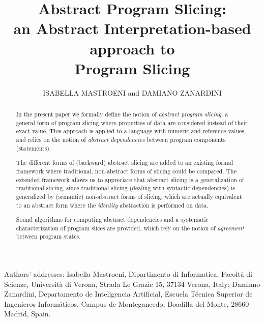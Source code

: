\documentclass[prodmode,acmtocl]{acmsmall}
\let\orgsetcounter\setcounter
\newcommand{\0}{\mbox{\bf 0}}
\begin{document}
\pagestyle{headings}  


\title{Abstract Program Slicing:\\ an Abstract Interpretation-based approach to\\ Program Slicing}

\author{
  ISABELLA MASTROENI 
  and DAMIANO ZANARDINI 
  }

\begin{abstract}
  In the present paper we formally define the notion of \emph{abstract
    program slicing}, a general form of program slicing where
  properties of data are considered instead of their exact value.
  This approach is applied to a language with numeric and reference
  values, and relies on the notion of \emph{abstract dependencies}
  between program components (statements).
  
  The different forms of (backward) abstract slicing are added to an
  existing formal framework where traditional, non-abstract forms of
  slicing could be compared.  The extended framework allows us to
  appreciate that abstract slicing is a generalization of traditional
  slicing, since traditional slicing (dealing with syntactic
  dependencies) is generalized by (semantic) non-abstract forms of
  slicing, which are actually equivalent to an abstract form where the
  \emph{identity} abstraction is performed on data.
  
  Sound algorithms for computing abstract dependencies and a
  systematic characterization of program slices are provided, which
  rely on the notion of \emph{agreement} between program states.
\end{abstract}


{\let\setcounter\orgsetcounter
\begin{bottomstuff}
  Authors' addresses: Isabella Mastroeni, Dipartimento di Informatica,
  Facolt\`a di Scienze, Universit\`a di Verona, Strada Le Grazie 15,
  37134 Verona, Italy; Damiano Zanardini, Departamento de Inteligencia
  Artificial, Escuela T\'ecnica Superior de Ingenieros Inform\'aticos,
  Campus de Montegancedo, Boadilla del Monte, 28660 Madrid, Spain.
\end{bottomstuff}
} 
\end{document}
